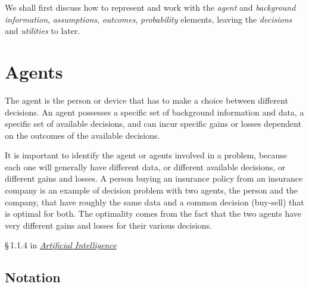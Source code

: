 \documentclass[
  a4paper,
  DIV=11,
  numbers=noendperiod,
  oneside]{scrreprt}
\begin{document}
We shall first discuss how to represent and work with the \emph{agent}
and \emph{background information}, \emph{assumptions}, \emph{outcomes},
\emph{probability} elements, leaving the \emph{decisions} and
\emph{utilities} to later.

\hypertarget{agents}{%
\section{Agents}\label{agents}}

The agent is the person or device that has to make a choice between
different decisions. An agent possesses a specific set of background
information and data, a specific set of available decisions, and can
incur specific gains or losses dependent on the outcomes of the
available decisions.


It is important to identify the agent or agents involved in a problem,
because each one will generally have different data, or different
available decisions, or different gains and losses. A person buying an
insurance policy from an insurance company is an example of decision
problem with two agents, the person and the company, that have roughly
the same data and a common decision (buy-sell) that is optimal for both.
The optimality comes from the fact that the two agents have very
different gains and losses for their various decisions.

\begin{tcolorbox}[enhanced jigsaw, rightrule=.15mm, colbacktitle=quarto-callout-caution-color!10!white, coltitle=black, titlerule=0mm, title={\faIcon{book-open} Reading}, colback=white, bottomrule=.15mm, toptitle=1mm, opacitybacktitle=0.6, toprule=.15mm, arc=.35mm, bottomtitle=1mm, colframe=quarto-callout-caution-color-frame, breakable, left=2mm, opacityback=0, leftrule=.75mm]

§\,1.1.4 in
\href{https://hvl.instructure.com/courses/25074/modules/items/660089}{\emph{Artificial
Intelligence}}

\end{tcolorbox}

\hypertarget{notation}{%
\subsection{Notation}\label{notation}}
\end{document}
